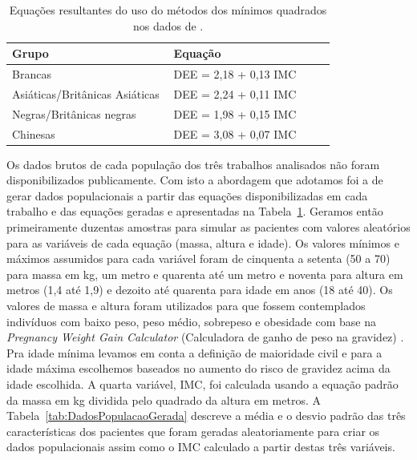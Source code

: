 \begin{table}[!ht]
\begin{center}
\caption{Equações resultantes do uso do métodos dos mínimos quadrados nos dados de \textcite{Sharma2011}.}
\label{tab:DEEEquacoesMinimosQuadrados}
\begin{tabular}{|p{0.4\linewidth}|p{0.4\linewidth}|}
\hline
\textbf{Grupo} & \textbf{Equação}\\
\hline\hline
Brancas & DEE = 2,18 + 0,13 IMC\\
Asiáticas/Britânicas Asiáticas & DEE = 2,24 + 0,11 IMC\\
Negras/Britânicas negras & DEE = 1,98 + 0,15 IMC\\
Chinesas & DEE = 3,08 + 0,07 IMC\\
\hline
\end{tabular}
\end{center}
\end{table}

Os dados brutos de cada população dos três trabalhos analisados não foram disponibilizados publicamente. Com isto a abordagem que adotamos foi a de gerar dados populacionais a partir das equações disponibilizadas em cada trabalho e das equações geradas e apresentadas na Tabela~\ref{tab:DEEEquacoesMinimosQuadrados}. Geramos então primeiramente duzentas amostras para simular as pacientes com valores aleatórios para as variáveis de cada equação (massa, altura e idade). Os valores mínimos e máximos assumidos para cada variável foram de cinquenta a setenta (50 a 70) para massa em kg, um metro e quarenta até um metro e noventa para altura em metros (1,4 até 1,9) e dezoito até quarenta para idade em anos (18 até 40). Os valores de massa e altura foram utilizados para que fossem contemplados indivíduos com baixo peso, peso médio, sobrepeso e obesidade com base na \textit{Pregnancy Weight Gain Calculator} (Calculadora de ganho de peso na gravidez) \cite{MTILLC2019}. Pra idade mínima levamos em conta a definição de maioridade civil e para a idade máxima escolhemos baseados no aumento do risco de gravidez acima da idade escolhida. A quarta variável, \acrshort{IMC}, foi calculada usando a equação padrão da massa em kg dividida pelo quadrado da altura em metros. 
A Tabela~\ref{tab:DadosPopulacaoGerada} descreve a média e o desvio padrão das três características dos pacientes que foram geradas aleatoriamente para criar os dados populacionais assim como o \acrshort{IMC} calculado a partir destas três variáveis. 

